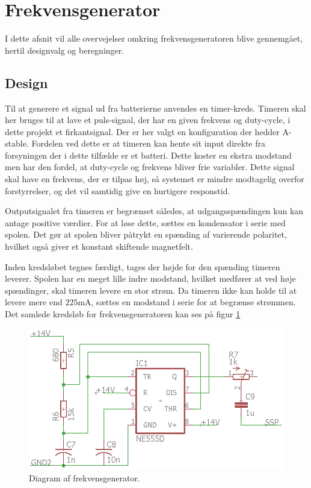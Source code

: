 \section{Frekvensgenerator}\label{sec:frekv_gen}
I dette afsnit vil alle overvejelser omkring frekvensgeneratoren blive gennemgået, hertil designvalg og beregninger. 
\subsection{Design}
Til at generere et signal ud fra batterierne anvendes en timer-kreds. 
Timeren skal her bruges til at lave et puls-signal, der har en given frekvens og duty-cycle, i dette projekt et firkantsignal. 
Der er her valgt en konfiguration der hedder A-stable. 
Fordelen ved dette er at timeren kan hente sit input direkte fra forsyningen der i dette tilfælde er et batteri. Dette koster en ekstra modstand men har den fordel, at duty-cycle og frekvens bliver frie variabler. 
Dette signal skal have en frekvens, der er tilpas høj, så systemet er mindre modtagelig overfor forstyrrelser, og det vil samtidig give en hurtigere responstid. 

Outputsignalet fra timeren er begrænset således, at udgangsspændingen kun kan antage positive værdier.
For at løse dette, sættes en kondensator i serie med spolen.
Det gør at spolen bliver påtrykt en spænding af varierende polaritet, hvilket også giver et konstant skiftende magnetfelt.

Inden kredsløbet tegnes færdigt, tages der højde for den spænding timeren leverer. 
Spolen har en meget lille indre modstand, hvilket medfører at ved høje spændinger, skal timeren levere en stor strøm. 
Da timeren ikke kan holde til at levere mere end $225 \si{\milli\ampere}$, sættes en modstand i serie for at begrænse strømmen. Det samlede kredsløb for frekvensgeneratoren kan ses på figur \ref{fig:frekvensgenerator}
\begin{figure}[h!]
	\centering
	\includegraphics[width=.6\textwidth]{billeder/generator.png}
	\caption{Diagram af frekvensgenerator.}
	\label{fig:frekvensgenerator}
\end{figure}


